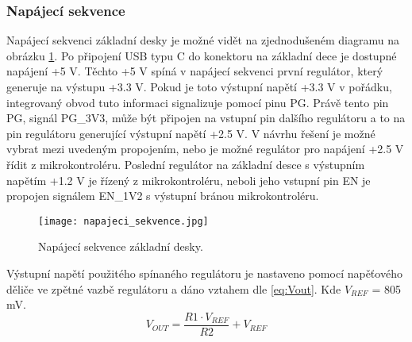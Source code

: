	\subsubsection{Napájecí sekvence}
	Napájecí sekvenci základní desky je možné vidět na zjednodušeném diagramu na obrázku \ref{fig:napajeci_sekvecne}. Po připojení USB typu C do konektoru na základní dece je dostupné napájení +5 V. Těchto +5 V spíná v napájecí sekvenci první regulátor, který generuje na výstupu +3.3 V. Pokud je toto výstupní napětí +3.3 V v pořádku, integrovaný obvod tuto informaci signalizuje pomocí pinu PG. Právě tento pin PG, signál PG\_3V3, může být připojen na vstupní pin dalšího regulátoru a to na pin regulátoru generující výstupní napětí +2.5 V. V návrhu řešení je možné vybrat mezi uvedeným propojením, nebo je možné regulátor pro napájení +2.5 V řídit z mikrokontroléru. Poslední regulátor na základní desce s výstupním napětím +1.2 V je řízený z mikrokontroléru, neboli jeho vstupní pin EN je propojen signálem EN\_1V2 s výstupní bránou mikrokontroléru.
	\begin{figure}[h!]
		\centering
		\captionsetup{justification=centering}
		\texttt{[image: napajeci\_sekvence.jpg]}
		\caption{Napájecí sekvence základní desky.} 
		\label{fig:napajeci_sekvecne}
	\end{figure}
	\par Výstupní napětí použitého spínaného regulátoru je nastaveno pomocí napěťového děliče ve zpětné vazbě regulátoru a dáno vztahem dle \ref{eq:Vout}. Kde $V_{REF}$ = 805 mV.
	\begin{equation}
		V_{OUT} = \frac{R1 \cdot V_{REF}}{R2} + V_{REF}
		\label{eq:Vout}
	\end{equation}

